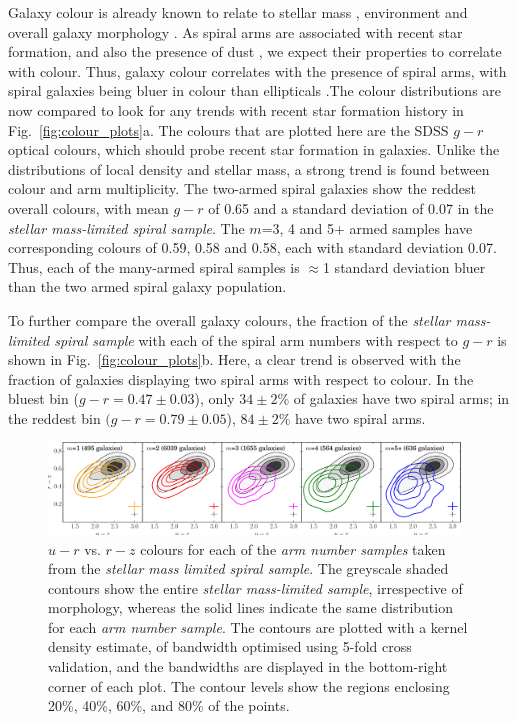 \documentclass[useAMS,usenatbib]{mn2e}
\begin{document}
Galaxy colour is already known to relate to stellar mass \citep{Baldry_06}, environment \citep{Baldry_04} and overall galaxy morphology \citep{Bamford_09}. As spiral arms are associated with recent star formation, and also the presence of dust \citep{Grosbol_12}, we expect their properties to correlate with colour. Thus, galaxy colour correlates with the presence of spiral arms, with spiral galaxies being bluer in colour than ellipticals \citep{Bamford_09,Schawinski_14}.The colour distributions are now compared to look for any trends with recent star formation history in Fig.~\ref{fig:colour_plots}a. The colours that are plotted here are the SDSS $g-r$ optical colours, which should probe recent star formation in galaxies. Unlike the distributions of local density and stellar mass, a strong trend is found between colour and arm multiplicity. The two-armed spiral galaxies show the reddest overall colours, with mean $g-r$ of 0.65 and a standard deviation of 0.07 in the \textit{stellar mass-limited spiral sample}. The $m$=3, 4 and 5+ armed samples have corresponding colours of 0.59, 0.58 and 0.58, each with standard deviation 0.07. Thus, each of the many-armed spiral samples is $\approx$1 standard deviation bluer than the two armed spiral galaxy population.

To further compare the overall galaxy colours, the fraction of the \textit{stellar mass-limited spiral sample} with each of the spiral arm numbers with respect to $g-r$ is shown in Fig.~\ref{fig:colour_plots}b. Here, a clear trend is observed with the fraction of galaxies displaying two spiral arms with respect to colour. In the bluest bin ($g-r=0.47 \pm 0.03$), only $34\pm2\%$ of galaxies have two spiral arms; in the reddest bin $(g-r=0.79 \pm 0.05$), $84\pm2\%$ have two spiral arms.

\begin{figure}
		\centering

        \includegraphics[width=0.975\textwidth]{Images/Results/cc1.pdf}

        \caption{$u-r$ vs. $r-z$ colours for each of the \textit{arm number samples} taken from the \textit{stellar mass limited spiral sample}. The greyscale shaded contours show the entire \textit{stellar mass-limited sample}, irrespective of morphology, whereas the solid lines indicate the same distribution for each \textit{arm number sample}. The contours are plotted with a kernel density estimate, of bandwidth optimised using 5-fold cross validation, and the bandwidths are displayed in the bottom-right corner of each plot. The contour levels show the regions enclosing 20\%, 40\%, 60\%, and 80\% of the points.}

        \label{fig:colour-colour}

\end{figure}
\end{document}
